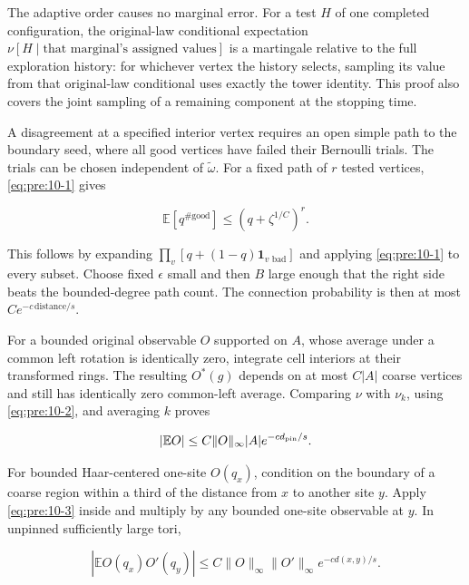 The adaptive order causes no marginal error. For a test \(H\) of one completed configuration, the original-law conditional expectation \(\nu[H\mid\text{that marginal's assigned values}]\) is a martingale relative to the full exploration history: for whichever vertex the history selects, sampling its value from that original-law conditional uses exactly the tower identity. This proof also covers the joint sampling of a remaining component at the stopping time.

A disagreement at a specified interior vertex requires an open simple path to the boundary seed, where all good vertices have failed their Bernoulli trials. The trials can be chosen independent of \(\widetilde\omega\). For a fixed path of \(r\) tested vertices, \eqref{eq:pre:10-1} gives

\begin{equation}
\mathbb E[q^{\#\mathrm{good}}]
\leq(q+\zeta^{1/C})^r.
\label{eq:pre:10-2}
\end{equation}

This follows by expanding \(\prod_v[q+(1-q)\mathbf1_{v\text{ bad}}]\) and applying \eqref{eq:pre:10-1} to every subset. Choose fixed \(\epsilon\) small and then \(B\) large enough that the right side beats the bounded-degree path count. The connection probability is then at most \(Ce^{-c\,\mathrm{distance}/s}\).

For a bounded original observable \(O\) supported on \(A\), whose average under a common left rotation is identically zero, integrate cell interiors at their transformed rings. The resulting \(O^*(g)\) depends on at most \(C|A|\) coarse vertices and still has identically zero common-left average. Comparing \(\nu\) with \(\nu_k\), using \eqref{eq:pre:10-2}, and averaging \(k\) proves

\begin{equation}
|\mathbb EO|\leq C\|O\|_\infty |A|e^{-c d_{\rm pin}/s}.
\label{eq:pre:10-3}
\end{equation}

For bounded Haar-centered one-site \(O(q_x)\), condition on the boundary of a coarse region within a third of the distance from \(x\) to another site \(y\). Apply \eqref{eq:pre:10-3} inside and multiply by any bounded one-site observable at \(y\). In unpinned sufficiently large tori,

\begin{equation}
|\mathbb E O(q_x)O'(q_y)|
\leq C\|O\|_\infty\|O'\|_\infty e^{-c d(x,y)/s}.
\label{eq:pre:10-4}
\end{equation}

